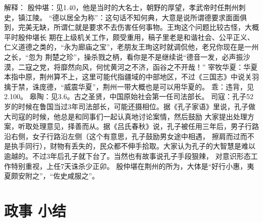 \documentclass[]{book}
\begin{document}
解释：
殷仲堪：见1.40，他是当时的大名士，朝野的厚望，孝武帝时任荆州刺史，镇江陵。
``德以居全为称''：这句话不知何典，大意是说所谓德要求面面俱到，完美无缺，所谓仁就是要求不去伤害任何事物。王珣这个问题比较古怪，大概平时殷仲堪长
期在上级机关工作，颇受重用，稿子里老是和谐社会、公平正义、仁义道德之类的，``永为廊庙之宝''，老朋友王珣这时就调侃他，老兄你现在是一州之长，``忽为
荆楚之珍''，操杀戮之柄，看你是不是继续说``德音一发，必声振沙漠，二寇之党，将靡然向风，何忧黄河之不济，函谷之不开哉！''
宰牧华夏：华夏本指中原，荆州算不上，这里可能代指疆域的中部地区，不过《三国志》中说关羽擒于禁，诛庞德，``威震华夏''，荆州一带大概也是可以用华夏的。
乖：违背，见2.100。 皋陶：见3.6。古之圣贤，中国原始社会第一任司法部长。
司寇：孔子52岁的时候在鲁国当过3年司法部长，可能还摄相位。据《孔子家语》里说，孔子做大司寇的时候，他总是和同事们一起认真地讨论案情，然后鼓励
大家提出处理方案，听取处理意见，择善而从。据《吕氏春秋》说，孔子被任用三年后，男子行路沿右侧，女子行路沿左侧（这个有意思，孔子鼓励男女途中相遇，
擦肩而过而不是执手同行），财物有丢失的，民众都不伸手拾取。大家认为孔子的大智慧是难以逾越的。不过3年后孔子就下台了。当然也有故事说孔子手段狠辣，
对意识形态工作特别重视，上任7天诛杀少正卯。
殷仲堪在荆州的所为，大体是``好行小惠，夷夏颇安附之''，``佐史咸服之''。

\section{政事 小结}\label{-}
\end{document}
